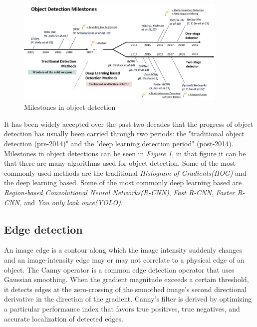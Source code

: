 \begin{figure}[h]
  \centering
  \includegraphics[width=0.9\textwidth]{graphics/objectdetection.png}
  \caption{Milestones in object detection \cite{zou_object_2019}}
  \label{fig:milestones}
\end{figure}
It has been widely accepted over the past two decades that the progress of object detection has usually been carried through two periods: the "traditional object detection (pre-2014)" and the "deep learning detection period" (post-2014). Milestones in object detections can be seen in \textit{Figure \ref{fig:milestones}}, in that figure it can be that there are many algorithms used for object detection. 
Some of the most commonly used methods are the traditional \textit{Histogram of Gradients(HOG)}\cite{dalal_histograms_2005} and the deep learning based. Some of the most commonly deep learning based are \textit{Region-based Convolutional Neural Networks(R-CNN)}\cite{girshick_region-based_2016}, \textit{Fast R-CNN}\cite{girshick_fast_2015}, \textit{Faster R-CNN}\cite{ren_faster_2016}, and \textit{You only look once(YOLO)}\cite{redmon_you_2016}.


\subsection{Edge detection} 
An image edge is a contour along which the image intensity suddenly changes and an image-intensity edge may or may not correlate to a physical edge of an object. The Canny operator\cite{nalwa_edge_1993} is a common edge detection operator that uses Gaussian smoothing. When the gradient magnitude exceeds a certain threshold, it detects edges at the zero-crossing of the smoothed image's second directional derivative in the direction of the gradient. Canny's filter is derived by optimizing a particular performance index that favors true positives, true negatives, and accurate localization of detected edges.

